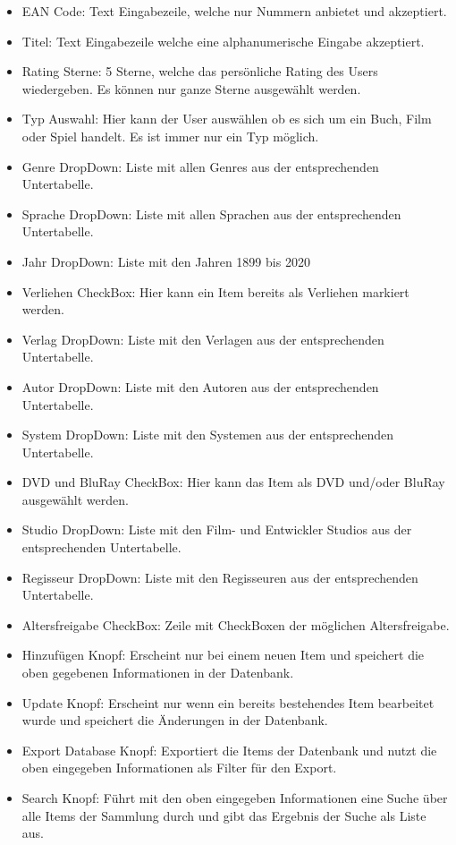 \begin{itemize}
	\item EAN Code: Text Eingabezeile, welche nur Nummern anbietet und akzeptiert.
	\item Titel: Text Eingabezeile welche eine alphanumerische Eingabe akzeptiert.
	\item Rating Sterne: 5 Sterne, welche das persönliche Rating des Users wiedergeben. Es können nur ganze Sterne ausgewählt werden.
	\item Typ Auswahl: Hier kann der User auswählen ob es sich um ein Buch, Film oder Spiel handelt. Es ist immer nur ein Typ möglich.
	\item Genre DropDown: Liste mit allen Genres aus der entsprechenden Untertabelle.
	\item Sprache DropDown: Liste mit allen Sprachen aus der entsprechenden Untertabelle.
	\item Jahr DropDown: Liste mit den Jahren 1899 bis 2020
	\item Verliehen CheckBox: Hier kann ein Item bereits als Verliehen markiert werden.
	\item Verlag DropDown: Liste mit den Verlagen aus der entsprechenden Untertabelle.
	\item Autor DropDown: Liste mit den Autoren aus der entsprechenden Untertabelle.
	\item System DropDown: Liste mit den Systemen aus der entsprechenden Untertabelle.
	\item DVD und BluRay CheckBox: Hier kann das Item als DVD und/oder BluRay ausgewählt werden.
	\item Studio DropDown: Liste mit den Film- und Entwickler Studios aus der entsprechenden Untertabelle.
	\item Regisseur DropDown: Liste mit den Regisseuren aus der entsprechenden Untertabelle.
	\item Altersfreigabe CheckBox: Zeile mit CheckBoxen der möglichen Altersfreigabe.
	\item Hinzufügen Knopf: Erscheint nur bei einem neuen Item und speichert die oben gegebenen Informationen in der Datenbank.
	\item Update Knopf: Erscheint nur wenn ein bereits bestehendes Item bearbeitet wurde und speichert die Änderungen in der Datenbank.
	\item Export Database Knopf: Exportiert die Items der Datenbank und nutzt die oben eingegeben Informationen als Filter für den Export.
	\item Search Knopf: Führt mit den oben eingegeben Informationen eine Suche über alle Items der Sammlung durch und gibt das Ergebnis der Suche als Liste aus. 
\end{itemize} 

